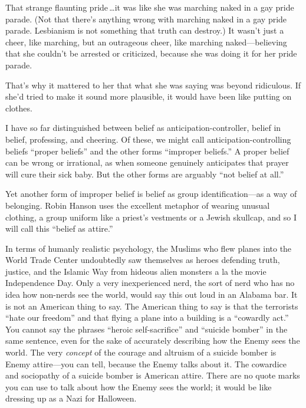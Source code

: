 {
 That strange flaunting pride\,\ldots it was like she was marching
naked in a gay pride parade. (Not that there's anything
wrong with marching naked in a gay pride parade. Lesbianism is not
something that truth can destroy.) It wasn't just a
cheer, like marching, but an outrageous cheer, like marching
naked---believing that she couldn't be arrested or
criticized, because she was doing it for her pride parade.}

{
 That's why it mattered to her that what she was
saying was beyond ridiculous. If she'd tried to make it
sound more plausible, it would have been like putting on clothes.}

\myendsectiontext


{
 I have so far distinguished between belief as
anticipation-controller, belief in belief, professing, and cheering. Of
these, we might call anticipation-controlling beliefs
``proper beliefs'' and the other
forms ``improper beliefs.'' A proper
belief can be wrong or irrational, as when someone genuinely
anticipates that prayer will cure their sick baby. But the other forms
are arguably ``not belief at all.''
}

{
 Yet another form of improper belief is belief as group
identification---as a way of belonging. Robin Hanson uses the excellent
metaphor of wearing unusual clothing, a group uniform like a
priest's vestments or a Jewish skullcap, and so I will
call this ``belief as attire.''}

{
 In terms of humanly realistic psychology, the Muslims who flew
planes into the World Trade Center undoubtedly saw themselves as heroes
defending truth, justice, and the Islamic Way from hideous alien
monsters a la the movie Independence Day. Only a very inexperienced
nerd, the sort of nerd who has no idea how non-nerds see the world,
would say this out loud in an Alabama bar. It is not an American thing
to say. The American thing to say is that the terrorists
``hate our freedom'' and that flying
a plane into a building is a ``cowardly
act.'' You cannot say the phrases
``heroic self-sacrifice'' and
``suicide bomber'' in the same
sentence, even for the sake of accurately describing how the Enemy sees
the world. The very \textit{concept} of the courage and altruism of a
suicide bomber is Enemy attire---you can tell, because the Enemy talks
about it. The cowardice and sociopathy of a suicide bomber is American
attire. There are no quote marks you can use to talk about how the
Enemy sees the world; it would be like dressing up as a Nazi for
Halloween.}

